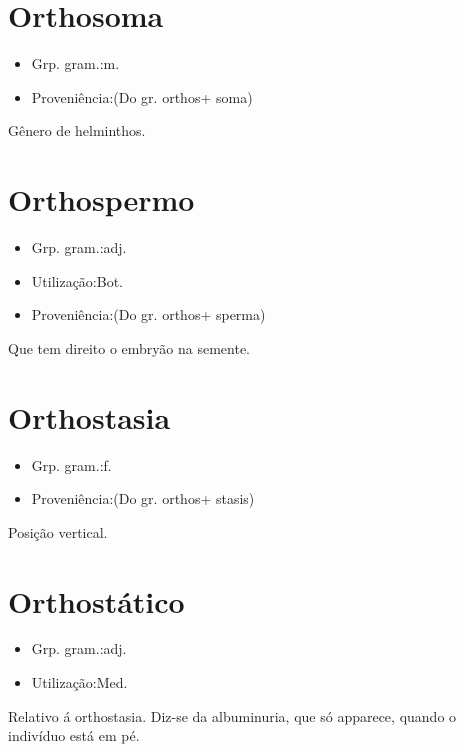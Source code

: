 \section{Orthosoma}
\begin{itemize}
\item {Grp. gram.:m.}
\end{itemize}
\begin{itemize}
\item {Proveniência:(Do gr. \textunderscore orthos\textunderscore  + \textunderscore soma\textunderscore )}
\end{itemize}
Gênero de helminthos.
\section{Orthospermo}
\begin{itemize}
\item {Grp. gram.:adj.}
\end{itemize}
\begin{itemize}
\item {Utilização:Bot.}
\end{itemize}
\begin{itemize}
\item {Proveniência:(Do gr. \textunderscore orthos\textunderscore  + \textunderscore sperma\textunderscore )}
\end{itemize}
Que tem direito o embryão na semente.
\section{Orthostasia}
\begin{itemize}
\item {Grp. gram.:f.}
\end{itemize}
\begin{itemize}
\item {Proveniência:(Do gr. \textunderscore orthos\textunderscore  + \textunderscore stasis\textunderscore )}
\end{itemize}
Posição vertical.
\section{Orthostático}
\begin{itemize}
\item {Grp. gram.:adj.}
\end{itemize}
\begin{itemize}
\item {Utilização:Med.}
\end{itemize}
Relativo á orthostasia.
Diz-se da albuminuria, que só apparece, quando o indivíduo está em pé.
